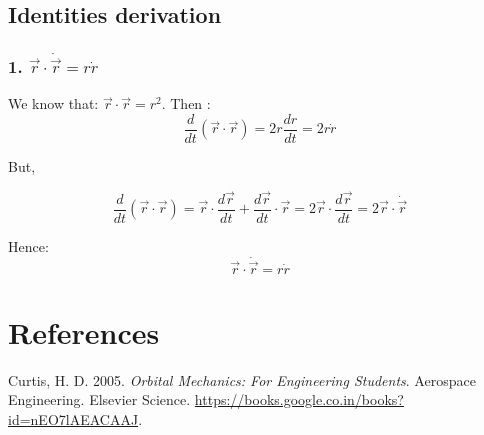 \documentclass[
  letterpaper,
  DIV=11,
  numbers=noendperiod]{scrreprt}
\newlength{\cslhangindent}
\newenvironment{CSLReferences}[2] %
 {\begin{list}{}{%
  \setlength{\itemindent}{0pt}
  \setlength{\leftmargin}{0pt}
  \setlength{\parsep}{0pt}
  \ifodd #1
   \setlength{\leftmargin}{\cslhangindent}
   \setlength{\itemindent}{-1\cslhangindent}
  \fi
  \setlength{\itemsep}{#2\baselineskip}}}
 {\end{list}}
\begin{document}
\section*{Identities derivation}\label{identities-derivation}


\subsection*{\texorpdfstring{1.
\(\vec{r}\cdot \dot{\vec{r}}=r\dot{r}\)}{1. \textbackslash vec\{r\}\textbackslash cdot \textbackslash dot\{\textbackslash vec\{r\}\}=r\textbackslash dot\{r\}}}\label{vecrcdot-dotvecrrdotr}

We know that: \(\vec{r}\cdot\vec{r}=r^2\). Then : \[
\frac{d}{dt}(\vec{r} \cdot \vec{r})=2r \frac{dr}{dt}=2r\dot{r}
\]

But,

\[
\frac{d}{dt}(\vec r\cdot \vec r)= \vec r\cdot \frac{d\vec r}{dt}+\frac{d\vec r}{dt}\cdot \vec r= 2\vec r\cdot \frac{d\vec r}{dt}=2\vec r\cdot \dot{\vec r}
\]

Hence: \[\boxed{\vec r \cdot\dot{\vec r}=r\dot r}\]


\chapter*{References}\label{references}


\label{refs}
\begin{CSLReferences}{1}{0}
Curtis, H. D. 2005. \emph{Orbital Mechanics: For Engineering Students}.
Aerospace Engineering. Elsevier Science.
\url{https://books.google.co.in/books?id=nEO7lAEACAAJ}.

\end{CSLReferences}
\end{document}
